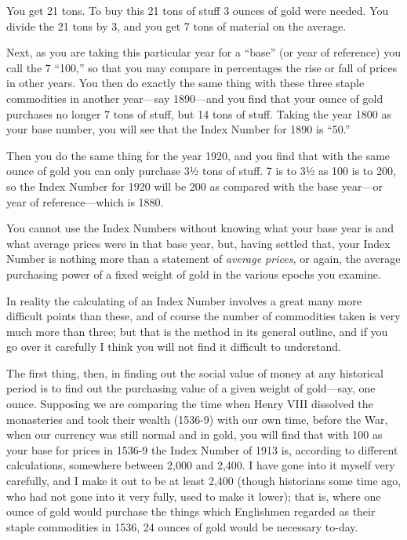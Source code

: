 \documentclass{book}
\begin{document}
You get 21 tons. To buy this 21 tons of stuff 3 ounces of gold were needed. You divide the 21 tons by 3, and you get 7 tons of material on the average.

Next, as you are taking this particular year for a “base” (or year of reference) you call the 7 “100,” so that you may compare in percentages the rise or fall of prices in other years. You then do exactly the same thing with these three staple commodities in another year—say 1890—and you find that your ounce of gold purchases no longer 7 tons of stuff, but 14 tons of stuff. Taking the year 1800 as your base number, you will see that the Index Number for 1890 is “50.”

Then you do the same thing for the year 1920, and you find that with the same ounce of gold you can only purchase 3½ tons of stuff. 7 is to 3½ as 100 is to 200, so the Index Number for 1920 will be 200 as compared with the base year—or year of reference—which is 1880.

You cannot use the Index Numbers without knowing what your base year is and what average prices were in that base year, but, having settled that, your Index Number is nothing more than a statement of \emph{average prices,} or again, the average purchasing power of a fixed weight of gold in the various epochs you examine.

In reality the calculating of an Index Number involves a great many more difficult points than these, and of course the number of commodities taken is very much more than three; but that is the method in its general outline, and if you go over it carefully I think you will not find it difficult to understand.\footnotemark[2]

The first thing, then, in finding out the social value of money at any historical period is to find out the purchasing value of a given weight of gold—say, one ounce. Supposing we are comparing the time when Henry VIII dissolved the monasteries and took their wealth (1536-9) with our own time, before the War, when our currency was still normal and in gold, you will find that with 100 as your base for prices in 1536-9 the Index Number of 1913 is, according to different calculations, somewhere between 2,000 and 2,400. I have gone into it myself very carefully, and I make it out to be at least 2,400 (though historians some time ago, who had not gone into it very fully, used to make it lower); that is, where one ounce of gold would purchase the things which Englishmen regarded as their staple commodities in 1536, 24 ounces of gold would be necessary to-day.
\end{document}
